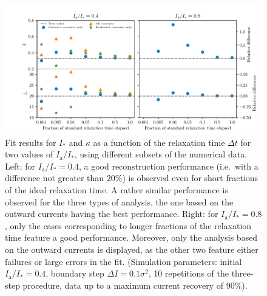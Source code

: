 \begin{figure}[htp]
    \centering
    \includegraphics[width=\textwidth]{4_probing_the_diffusive_behavior/figs/final/better_plot.pdf}
    \caption{Fit results for $I_\ast$ and $\kappa$ as a function of the relaxation time $\Delta t$ for two values of $I_\mathrm{a}/I_\ast$, using different subsets of the numerical data. Left: for $I_\mathrm{a}/I_\ast=0.4$, a good reconstruction performance  {(i.e.\ with a difference not greater than $20\%$)} is observed even for short fractions of the ideal relaxation time. A rather similar performance is observed for the three types of analysis, the one based on the outward currents having the best performance. Right: for $I_\mathrm{a} / I_\ast=0.8$, only the cases corresponding to longer fractions of the relaxation time feature a good performance. Moreover, only the analysis based on the outward currents is displayed, as the other two feature either failures or large errors in the fit. (Simulation parameters: initial $I_\mathrm{a}/I_\ast=0.4$, boundary step $\Delta I =0.1 \sigma^2$, 10 repetitions of the three-step procedure, data up to a maximum current recovery of $90\%$).}
    \label{fig:all_different_time}
\end{figure}
%

